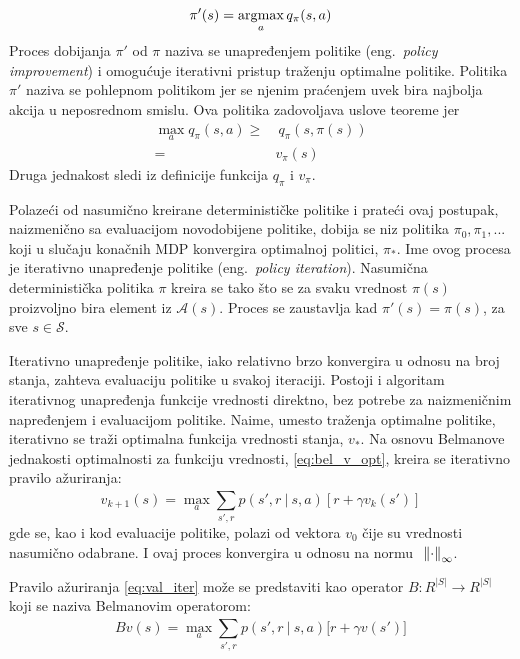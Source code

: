 \begin{equation}
	\pi'(s) = \operatorname*{\arg\!\max}_a q_{\pi}(s, a)
\end{equation}
Proces dobijanja $\pi'$ od $\pi$  naziva se unapređenjem politike (eng.~{\em policy improvement}) i omogućuje iterativni pristup traženju optimalne politike. Politika $\pi'$ naziva se pohlepnom politikom jer se njenim praćenjem uvek bira najbolja akcija u neposrednom smislu. Ova politika zadovoljava uslove teoreme jer
\begin{align}
	\max_a q_{\pi}(s,a) \geq&~ q_{\pi}(s,\pi(s)) \\=& v_{\pi}(s)
\end{align}
Druga jednakost sledi iz definicije funkcija $q_{\pi}$ i $v_{\pi}$.
\par 
Polazeći od nasumično kreirane determinističke politike i prateći ovaj postupak, naizmenično sa evaluacijom novodobijene politike, dobija se niz politika $\pi_0, \pi_1, ...$ koji u slučaju konačnih MDP konvergira optimalnoj politici, $\pi_*$. Ime ovog procesa je iterativno unapređenje politike (eng.~{\em policy iteration}). Nasumična deterministička politika $\pi$ kreira se tako što se za svaku vrednost $\pi(s)$ proizvoljno bira element iz $\mathcal{A}(s)$. Proces se zaustavlja kad $\pi'(s) = \pi(s)$, za sve $s \in \mathcal{S}$.
\par 
Iterativno unapređenje politike, iako relativno brzo konvergira u odnosu na broj stanja, zahteva evaluaciju politike u svakoj iteraciji. Postoji i algoritam iterativnog unapređenja funkcije vrednosti direktno, bez potrebe za naizmeničnim napređenjem i evaluacijom politike. Naime, umesto traženja optimalne politike, iterativno se traži optimalna funkcija vrednosti stanja, $v_*$. Na osnovu Belmanove jednakosti optimalnosti za funkciju vrednosti, \eqref{eq:bel_v_opt}, kreira se iterativno pravilo ažuriranja:
\begin{equation}
	\label{eq:val_iter} v_{k+1}(s) = \max_{a}\sum_{s', r}^{} p(s', r~|~s,a)[r+\gamma v_k(s')]
\end{equation}
gde se, kao i kod evaluacije politike, polazi od vektora $v_0$ čije su vrednosti nasumično odabrane. I ovaj proces konvergira u odnosu na normu ~$\norm{\cdot}_{\infty}$.
\par 
Pravilo ažuriranja \eqref{eq:val_iter} može se predstaviti kao operator $B:R^{|S|} \rightarrow R^{|S|}$ koji se naziva Belmanovim operatorom:
\begin{equation}
	Bv(s) = \max_{a}\sum_{s', r}^{} p(s', r~|~s,a)\big[r + \gamma v(s')\big]
\end{equation}
